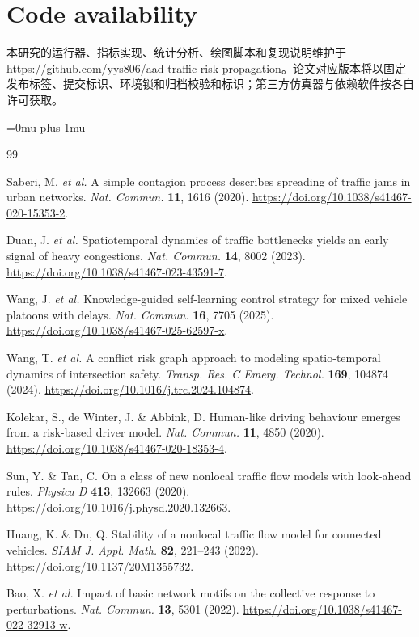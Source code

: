 \documentclass[10pt,a4paper,twocolumn]{article}
\begin{document}
\section*{Code availability}
本研究的运行器、指标实现、统计分析、绘图脚本和复现说明维护于 \url{https://github.com/yys806/aad-traffic-risk-propagation}。论文对应版本将以固定发布标签、提交标识、环境锁和归档校验和标识；第三方仿真器与依赖软件按各自许可获取。

\begingroup
\sloppy
\raggedright
\Urlmuskip=0mu plus 1mu\relax
\begin{thebibliography}{99}

Saberi, M. \textit{et al.} A simple contagion process describes spreading of traffic jams in urban networks. \textit{Nat. Commun.} \textbf{11}, 1616 (2020). \url{https://doi.org/10.1038/s41467-020-15353-2}.

Duan, J. \textit{et al.} Spatiotemporal dynamics of traffic bottlenecks yields an early signal of heavy congestions. \textit{Nat. Commun.} \textbf{14}, 8002 (2023). \url{https://doi.org/10.1038/s41467-023-43591-7}.

Wang, J. \textit{et al.} Knowledge-guided self-learning control strategy for mixed vehicle platoons with delays. \textit{Nat. Commun.} \textbf{16}, 7705 (2025). \url{https://doi.org/10.1038/s41467-025-62597-x}.

Wang, T. \textit{et al.} A conflict risk graph approach to modeling spatio-temporal dynamics of intersection safety. \textit{Transp. Res. C Emerg. Technol.} \textbf{169}, 104874 (2024). \url{https://doi.org/10.1016/j.trc.2024.104874}.

Kolekar, S., de Winter, J. \& Abbink, D. Human-like driving behaviour emerges from a risk-based driver model. \textit{Nat. Commun.} \textbf{11}, 4850 (2020). \url{https://doi.org/10.1038/s41467-020-18353-4}.

Sun, Y. \& Tan, C. On a class of new nonlocal traffic flow models with look-ahead rules. \textit{Physica D} \textbf{413}, 132663 (2020). \url{https://doi.org/10.1016/j.physd.2020.132663}.

Huang, K. \& Du, Q. Stability of a nonlocal traffic flow model for connected vehicles. \textit{SIAM J. Appl. Math.} \textbf{82}, 221--243 (2022). \url{https://doi.org/10.1137/20M1355732}.

Bao, X. \textit{et al.} Impact of basic network motifs on the collective response to perturbations. \textit{Nat. Commun.} \textbf{13}, 5301 (2022). \url{https://doi.org/10.1038/s41467-022-32913-w}.


\end{thebibliography}
\end{document}
